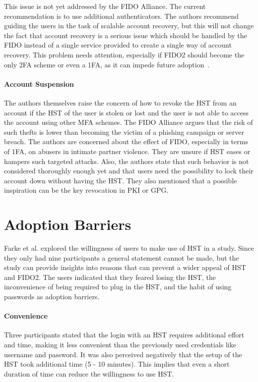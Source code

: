 \documentclass[runningheads]{llncs}
\begin{document}
This issue is not yet addressed by the FIDO Alliance. The current recommendation is to use additional authenticators. The authors recommend guiding the users in the task of scalable account recovery, but this will not change the fact that account recovery is a serious issue which should be handled by the FIDO instead of a single service provided to create a single way of account recovery. This problem needs attention, especially if FIDO2 should become the only 2FA scheme or even a 1FA, as it can impede future adoption~\cite{9152694}. 

\paragraph{Account Suspension}
The authors themselves raise the concern of how to revoke the HST from an account if the HST of the user is stolen or lost and the user is not able to access the account using other MFA schemes. The FIDO Alliance argues that the risk of such thefts is lower than becoming the victim of a phishing campaign or server breach. The authors are concerned about the effect of FIDO, especially in terms of 1FA, on abusers in intimate partner violence. They are unsure if HST eases or hampers such targeted attacks. Also, the authors state that such behavior is not considered thoroughly enough yet and that users need the possibility to lock their account down without having the HST. They also mentioned that a possible inspiration can be the key revocation in PKI or GPG.

\section{Adoption Barriers}
Farke et al. explored the willingness of users to make use of HST in a study. Since they only had nine participants a general statement cannot be made, but the study can provide insights into reasons that can prevent a wider appeal of HST and FIDO2. The users indicated that they feared losing the HST, the inconvenience of being required to plug in the HST, and the habit of using passwords as adoption barriers.

\paragraph{Convenience}
Three participants stated that the login with an HST requires additional effort and time, making it less convenient than the previously used credentials like username and password. It was also perceived negatively that the setup of the HST took additional time (5 - 10 minutes). This implies that even a short duration of time can reduce the willingness to use HST.
\end{document}
